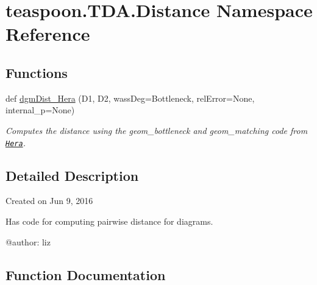 \hypertarget{namespaceteaspoon_1_1_t_d_a_1_1_distance}{}\section{teaspoon.\+T\+D\+A.\+Distance Namespace Reference}
\label{namespaceteaspoon_1_1_t_d_a_1_1_distance}
\subsection*{Functions}
\begin{DoxyCompactItemize}
\item 
def \hyperlink{namespaceteaspoon_1_1_t_d_a_1_1_distance_ad3481b3888962dbf302bacb9d9504e8b}{dgm\+Dist\+\_\+\+Hera} (D1, D2, wass\+Deg=\textquotesingle{}Bottleneck\textquotesingle{}, rel\+Error=None, internal\+\_\+p=None)
\begin{DoxyCompactList}\small\item\em Computes the distance using the geom\+\_\+bottleneck and geom\+\_\+matching code from \href{https://bitbucket.org/grey_narn/hera}{\tt Hera}. \end{DoxyCompactList}\end{DoxyCompactItemize}


\subsection{Detailed Description}
\begin{DoxyVerb}Created on Jun 9, 2016

Has code for computing pairwise distance for diagrams.

@author: liz
\end{DoxyVerb}
 

\subsection{Function Documentation}
\mbox{\label{namespaceteaspoon_1_1_t_d_a_1_1_distance_ad3481b3888962dbf302bacb9d9504e8b}} 
